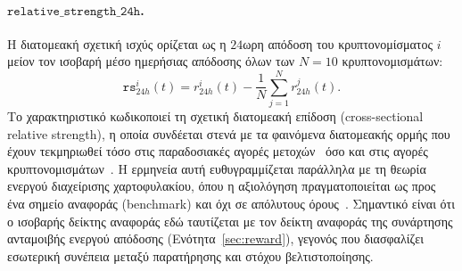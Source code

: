 \paragraph{$\mathtt{relative\_strength\_24h}$.}
Η διατομεακή σχετική ισχύς ορίζεται ως η $24$ωρη απόδοση του κρυπτονομίσματος
$i$ μείον τον ισοβαρή μέσο ημερήσιας απόδοσης όλων των $N = 10$
κρυπτονομισμάτων:
\begin{equation}
  \mathtt{rs}^{i}_{24h}(t) = r^{i}_{24h}(t) - \frac{1}{N}\sum_{j=1}^{N} r^{j}_{24h}(t).
  \label{eq:relstrength}
\end{equation}
Το χαρακτηριστικό κωδικοποιεί τη σχετική διατομεακή επίδοση
(cross-sectional relative strength), η οποία συνδέεται στενά με τα φαινόμενα
διατομεακής ορμής που έχουν τεκμηριωθεί τόσο στις παραδοσιακές αγορές
μετοχών~\cite{jegadeesh1993} όσο και στις αγορές
κρυπτονομισμάτων~\cite{liu2022common}. Η ερμηνεία αυτή ευθυγραμμίζεται
παράλληλα με τη θεωρία ενεργού διαχείρισης χαρτοφυλακίου, όπου η αξιολόγηση
πραγματοποιείται ως προς ένα σημείο αναφοράς (benchmark)
και όχι σε απόλυτους όρους~\cite{grinoldkahn1999}. Σημαντικό
είναι ότι ο ισοβαρής δείκτης αναφοράς εδώ ταυτίζεται με τον δείκτη αναφοράς
της συνάρτησης ανταμοιβής ενεργού απόδοσης (Ενότητα~\ref{sec:reward}),
γεγονός που διασφαλίζει εσωτερική συνέπεια μεταξύ παρατήρησης και στόχου
βελτιστοποίησης.

